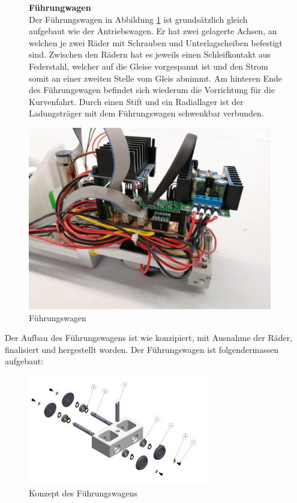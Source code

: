\documentclass[../../main.tex]{subfiles}
\begin{document}
\pagebreak

\begin{figure}[H]
  \begin{minipage}{.5\textwidth}
    \textbf{Führungwagen}\\
    Der Führungswagen in Abbildung \ref{fig:fuehrungswagen1} ist grundsätzlich gleich aufgebaut wie der Antriebswagen. Er hat zwei gelagerte Achsen, an welchen je zwei Räder mit Schrauben und Unterlagscheiben befestigt sind. Zwischen den Rädern hat es jeweils einen Schleifkontakt aus Federstahl, welcher auf die Gleise vorgespannt ist und den Strom somit an einer zweiten Stelle vom Gleis abnimmt. Am hinteren Ende des Führungswagen befindet sich wiederum die Vorrichtung für die Kurvenfahrt. Durch einen Stift und ein Radiallager ist der Ladungsträger mit dem Führungswagen schwenkbar verbunden.
   \end{minipage}
  \begin{minipage}{.5\textwidth}
    \flushright
    \includegraphics[width=0.95\textwidth]{fuehrungswagen1.PNG}
    \caption {Führungswagen}
    \label{fig:fuehrungswagen1}
    \end{minipage} 
\end{figure} 

Der Aufbau des Führungswagens ist wie konzipiert, mit Ausnahme der Räder, finalisiert und hergestellt worden. Der Führungswagen ist folgendermassen aufgebaut:\\

\begin{figure}[H]
  \centering
  \includegraphics[width=0.7\textwidth]{fuehrungswagen.PNG}
  \caption {Konzept des Führungswagens}
  \label{fig:fuehrungswagen2}
\end{figure}
\end{document}

